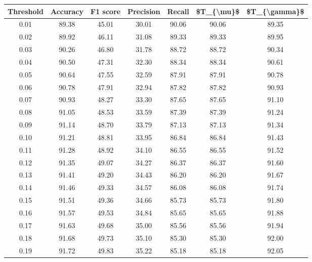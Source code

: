 \begin{tabular}{|c|c|c|c|c|c|c|}
\hline
 Threshold &  Accuracy &  F1 score &  Precision &  Recall &  \$T\_\{\textbackslash mu\}\$ &  \$T\_\{\textbackslash gamma\}\$ \\
\hline
      0.01 &     89.38 &     45.01 &      30.01 &   90.06 &      90.06 &         89.35 \\
      0.02 &     89.92 &     46.11 &      31.08 &   89.33 &      89.33 &         89.95 \\
      0.03 &     90.26 &     46.80 &      31.78 &   88.72 &      88.72 &         90.34 \\
      0.04 &     90.50 &     47.31 &      32.30 &   88.34 &      88.34 &         90.61 \\
      0.05 &     90.64 &     47.55 &      32.59 &   87.91 &      87.91 &         90.78 \\
      0.06 &     90.78 &     47.91 &      32.94 &   87.82 &      87.82 &         90.93 \\
      0.07 &     90.93 &     48.27 &      33.30 &   87.65 &      87.65 &         91.10 \\
      0.08 &     91.05 &     48.53 &      33.59 &   87.39 &      87.39 &         91.24 \\
      0.09 &     91.14 &     48.70 &      33.79 &   87.13 &      87.13 &         91.34 \\
      0.10 &     91.21 &     48.81 &      33.95 &   86.84 &      86.84 &         91.43 \\
      0.11 &     91.28 &     48.92 &      34.10 &   86.55 &      86.55 &         91.52 \\
      0.12 &     91.35 &     49.07 &      34.27 &   86.37 &      86.37 &         91.60 \\
      0.13 &     91.41 &     49.20 &      34.43 &   86.20 &      86.20 &         91.67 \\
      0.14 &     91.46 &     49.33 &      34.57 &   86.08 &      86.08 &         91.74 \\
      0.15 &     91.51 &     49.36 &      34.66 &   85.73 &      85.73 &         91.80 \\
      0.16 &     91.57 &     49.53 &      34.84 &   85.65 &      85.65 &         91.88 \\
      0.17 &     91.63 &     49.68 &      35.00 &   85.56 &      85.56 &         91.94 \\
      0.18 &     91.68 &     49.73 &      35.10 &   85.30 &      85.30 &         92.00 \\
      0.19 &     91.72 &     49.83 &      35.22 &   85.18 &      85.18 &         92.05 \\

\end{tabular}
